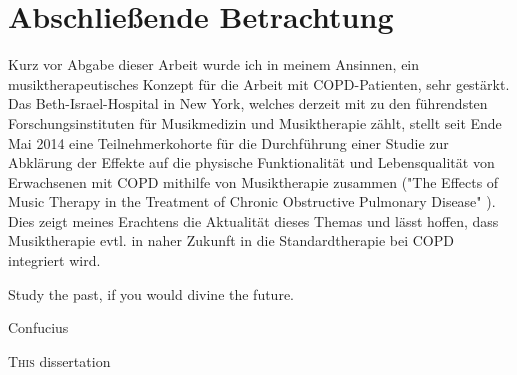 \chapter{Abschließende Betrachtung} %
Kurz vor Abgabe dieser Arbeit wurde ich in meinem Ansinnen, ein musiktherapeutisches Konzept für die Arbeit mit COPD-Patienten, sehr gestärkt. Das Beth-Israel-Hospital in New York, welches derzeit mit zu den führendsten Forschungsinstituten für Musikmedizin und Musiktherapie zählt, stellt seit Ende Mai 2014 eine Teilnehmerkohorte für die Durchführung einer Studie zur Abklärung der Effekte auf die physische Funktionalität und Lebensqualität von Erwachsenen mit COPD mithilfe von Musiktherapie zusammen ("The Effects of Music Therapy in the Treatment of Chronic Obstructive Pulmonary Disease" ). Dies zeigt meines Erachtens die Aktualität dieses Themas und lässt hoffen, dass Musiktherapie evtl. in naher Zukunft in die Standardtherapie bei COPD integriert wird.



\setlength{\epigraphwidth}{7.5cm}
\epigraph{Study the past, if you would divine the future.}{Confucius}

\ifpdf
    \graphicspath{{X/figures/PNG/}{X/figures/PDF/}{X/figures/}}
\else
    \graphicspath{{X/figures/EPS/}{X/figures/}}
\fi

\lettrine{T}{his} dissertation 

\newpage\thispagestyle{empty}
